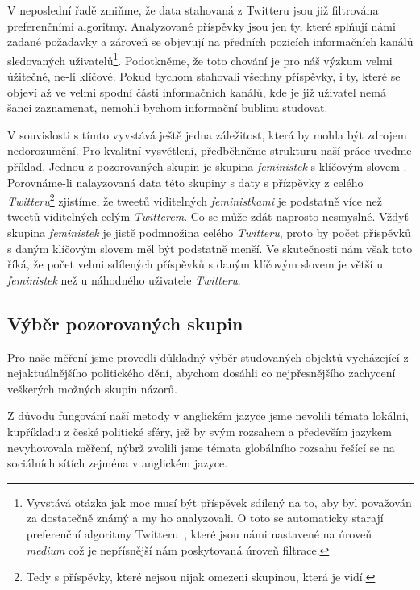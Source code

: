 \documentclass[12pt, a4paper]{article}
\numberwithin{equation}{section} 	%
\begin{document}
V neposlední řadě zmiňme, že data stahovaná z Twitteru jsou již filtrována preferenčními algoritmy. Analyzované příspěvky jsou jen ty, které splňují námi zadané požadavky a zároveň se objevují na předních pozicích informačních kanálů sledovaných uživatelů\footnote{Vyvstává otázka jak moc musí být příspěvek sdílený na to, aby byl považován za dostatečně známý a my ho analyzovali. O toto se automaticky starají preferenční algoritmy Twitteru~\cite{twitterAPI}, které jsou námi nastavené na úroveň \textit{medium} což je nepřísnější nám poskytovaná úroveň filtrace.}. Podotkněme, že toto chování je pro náš výzkum velmi úžitečné, ne-li klíčové. Pokud bychom stahovali všechny příspěvky, i ty, které se objeví až ve velmi spodní části informačních kanálů, kde je již uživatel nemá šanci zaznamenat, nemohli bychom informační bublinu studovat.

V souvislosti s tímto vyvstává ještě jedna záležitost, která by mohla být zdrojem nedorozumění. Pro kvalitní vysvětlení, předběhněme strukturu naší práce uveďme příklad. Jednou z pozorovaných skupin je skupina \textit{feministek} s klíčovým slovem \textit{}. Porovnáme-li nalayzovaná data této skupiny s daty s přízpěvky z celého \textit{Twitteru}\footnote{Tedy s příspěvky, které nejsou nijak omezeni skupinou, která je vidí.} zjistíme, že tweetů viditelných \textit{feministkami} je podstatně více než tweetů viditelných celým \textit{Twitterem}. Co se může zdát naprosto nesmyslné. Vždyť skupina \textit{feministek} je jistě podmnožina celého \textit{Twitteru}, proto by počet příspěvků s daným klíčovým slovem měl být podstatně menší. Ve skutečnosti nám však toto říká, že počet velmi sdílených příspěvků s daným klíčovým slovem je větší u \textit{feministek} než u náhodného uživatele \textit{Twitteru}.

\subsection{Výběr pozorovaných skupin}
\noindent Pro naše měření jsme provedli důkladný výběr studovaných objektů vycházející z nejaktuálnějšího politického dění, abychom dosáhli co nejpřesnějšího zachycení veškerých možných skupin názorů.

Z důvodu fungování naší metody v anglickém jazyce jsme nevolili témata lokální, kupříkladu z české politické sféry, jež by svým rozsahem a především jazykem nevyhovovala měření, nýbrž zvolili jsme témata globálního rozsahu řešící se na sociálních sítích zejména v anglickém jazyce.
\end{document}
